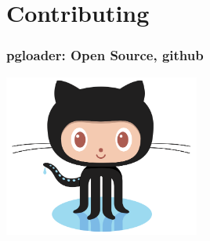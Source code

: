 \documentclass[xcolor=dvipsnames]{beamer}
\begin{document}
\section{Contributing}

{
  \begin{frame}[plain]
  \end{frame}
}

\begin{frame}
  \frametitle{pgloader: Open Source, github}


  \begin{center}
    \includegraphics[height=2.1in]{Octocat.png}
  \end{center}
\end{frame}
\end{document}

